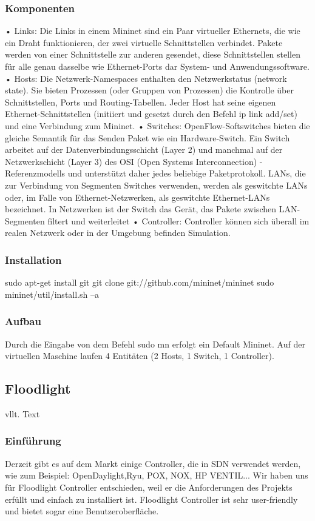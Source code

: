\documentclass[fontsize=12pt,paper=a4,open=any,parskip=half,
  twoside=false,toc=listof,toc=bibliography,fleqn,leqno,
  captions=nooneline,captions=tableabove,british]{scrbook}
\begin{document}
\subsubsection{Komponenten}
•      Links: Die Links in einem Mininet sind ein Paar virtueller Ethernets, die wie ein Draht funktionieren, der zwei virtuelle Schnittstellen verbindet. Pakete werden von einer Schnittstelle zur anderen gesendet, diese Schnittstellen stellen für alle genau dasselbe wie Ethernet-Ports dar System- und Anwendungssoftware.
•      Hosts: Die Netzwerk-Namespaces enthalten den Netzwerkstatus (network state). Sie bieten Prozessen (oder Gruppen von Prozessen) die Kontrolle über Schnittstellen, Ports und Routing-Tabellen. Jeder Host hat seine eigenen Ethernet-Schnittstellen (initiiert und gesetzt durch den Befehl ip link add/set) und eine Verbindung zum Mininet.
•      Switches: OpenFlow-Softswitches bieten die gleiche Semantik für das Senden
Paket wie ein Hardware-Switch. Ein Switch arbeitet auf der Datenverbindungsschicht (Layer 2) und manchmal auf der Netzwerkschicht (Layer 3) des OSI (Open Systems Interconnection) -Referenzmodells und unterstützt daher jedes beliebige Paketprotokoll. LANs, die zur Verbindung von Segmenten Switches verwenden, werden als geswitchte LANs oder, im Falle von Ethernet-Netzwerken, als geswitchte Ethernet-LANs bezeichnet. In Netzwerken ist der Switch das Gerät, das Pakete zwischen LAN-Segmenten filtert und weiterleitet
•      Controller: Controller können sich überall im realen Netzwerk oder in der Umgebung befinden Simulation.
\subsubsection{Installation}
sudo apt-get install git
git clone git://github.com/mininet/mininet
sudo mininet/util/install.sh –a
\subsubsection{Aufbau}
Durch die Eingabe von dem Befehl sudo mn erfolgt ein Default Mininet. Auf der virtuellen Maschine laufen 4 Entitäten (2 Hosts, 1 Switch, 1 Controller).

\subsection{Floodlight}
vllt. Text
\subsubsection{Einführung}
Derzeit gibt es auf dem Markt einige Controller, die in SDN verwendet werden, wie zum Beispiel: OpenDaylight,Ryu, POX, NOX, HP VENTIL...            Wir haben uns für Floodlight Controller entschieden, weil er die Anforderungen des Projekts erfüllt und einfach zu installiert ist. Floodlight Controller ist sehr user-friendly und bietet sogar eine Benutzeroberfläche.
\end{document}
